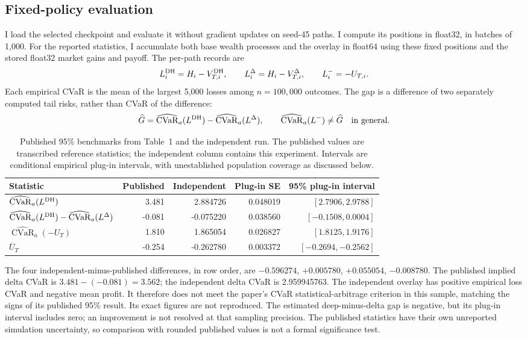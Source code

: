 \documentclass[11pt,a4paper]{article}
\newcommand{\CVaR}{\operatorname{CVaR}}
\theoremstyle{remark}
\begin{document}
\subsection{Fixed-policy evaluation}
I load the selected checkpoint and evaluate it without gradient updates on seed-45 paths. I compute its positions in float32, in batches of 1,000. For the reported statistics, I accumulate both base wealth processes and the overlay in float64 using these fixed positions and the stored float32 market gains and payoff. The per-path records are
\begin{equation}
 L_i^{\rm DH}=H_i-V_{T,i}^{\rm DH},\qquad
 L_i^\Delta=H_i-V_{T,i}^\Delta,\qquad L_i^-=-U_{T,i}.
\end{equation}
Each empirical CVaR is the mean of the largest 5,000 losses among $n=100,000$ outcomes. The gap is a difference of two separately computed tail risks, rather than CVaR of the difference:
\begin{equation}
 \widehat G=\widehat{\CVaR}_a(L^{\rm DH})-\widehat{\CVaR}_a(L^\Delta),
 \qquad \widehat{\CVaR}_a(L^-)\ne\widehat G\quad\hbox{in general}.
\end{equation}

\begin{table}[htbp]
\centering\footnotesize
\caption{Published 95\% benchmarks from Table~1 and the independent run. The published values are transcribed reference statistics; the independent column contains this experiment. Intervals are conditional empirical plug-in intervals, with unestablished population coverage as discussed below.}
\label{tab:results}
\begin{tabular}{@{}lrrrr@{}}
\toprule
Statistic & Published & Independent & Plug-in SE & 95\% plug-in interval\\
\midrule
$\widehat{\operatorname{CVaR}}_a(L^{\rm DH})$ & 3.481 & 2.884726 & 0.048019 & $[2.7906,2.9788]$ \\
$\widehat{\operatorname{CVaR}}_a(L^{\rm DH})-\widehat{\operatorname{CVaR}}_a(L^\Delta)$ & -0.081 & -0.075220 & 0.038560 & $[-0.1508,0.0004]$ \\
$\widehat{\operatorname{CVaR}}_a(-U_T)$ & 1.810 & 1.865054 & 0.026827 & $[1.8125,1.9176]$ \\
$\overline U_T$ & -0.254 & -0.262780 & 0.003372 & $[-0.2694,-0.2562]$ \\
\bottomrule
\end{tabular}
\end{table}
The four independent-minus-published differences, in row order, are $-0.596274$, $+0.005780$, $+0.055054$, $-0.008780$. The published implied delta CVaR is $3.481-(-0.081)=3.562$; the independent delta CVaR is 2.959945763. The independent overlay has positive empirical loss CVaR and negative mean profit. It therefore does not meet the paper's CVaR statistical-arbitrage criterion in this sample, matching the signs of its published 95\% result. Its exact figures are not reproduced. The estimated deep-minus-delta gap is negative, but its plug-in interval includes zero; an improvement is not resolved at that sampling precision. The published statistics have their own unreported simulation uncertainty, so comparison with rounded published values is not a formal significance test.
\end{document}
